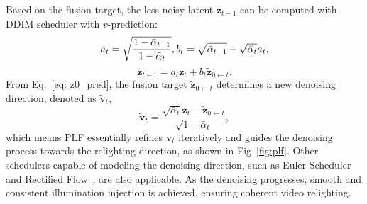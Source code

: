 Based on the fusion target, the less noisy latent $\mathbf{z}_{t-1}$ can be computed with DDIM scheduler with $v$-prediction:
\begin{equation}
    a_t=\sqrt{\frac{1-\bar{\alpha}_{t-1}}{1-\bar{\alpha}_t}},\\
    b_t=\sqrt{\bar{\alpha}_{t-1}}-\sqrt{\bar{\alpha}_t}  a_t,
\end{equation}
\begin{equation}
\mathbf{z}_{t-1}=a_t \mathbf{z}_t+b_t  \tilde{\mathbf{z}}_{0 \gets t}.
\end{equation}
From Eq.~\ref{eq: z0_pred}, the fusion target $ \tilde{\mathbf{z}}_{0 \gets t} $ determines a new denoising direction,
denoted as $\tilde{\mathbf{v}}_t$,
\begin{equation}
\tilde{\mathbf{v}}_t=\frac{\sqrt{\bar{\alpha}_t} \mathbf{z}_t-\tilde{\mathbf{z}}_{0 \gets t}}{\sqrt{1-\bar{\alpha}_t}},
\end{equation}
which means PLF essentially refines $\mathbf{v}_t$ iteratively and
guides the denoising process towards the relighting direction, as shown in Fig~\ref{fig:plf}.
Other schedulers capable of modeling the denoising direction, such as Euler Scheduler~\cite{karras2022elucidating} and Rectified Flow~\cite{lipman2022flow}, are also applicable.
As the denoising progresses, smooth and consistent illumination injection is achieved, ensuring coherent video relighting.